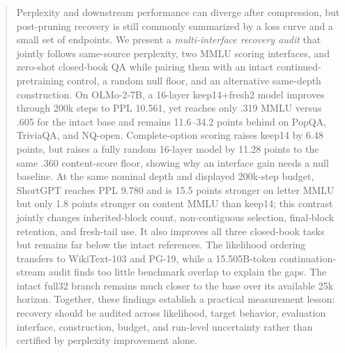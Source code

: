 \begin{abstract}
Perplexity and downstream performance can diverge after compression, but
post-pruning recovery is still commonly summarized by a loss curve and a small
set of endpoints. We present a \emph{multi-interface recovery audit} that
jointly follows same-source perplexity, two MMLU scoring
interfaces, and zero-shot closed-book QA while pairing them with an intact
continued-pretraining control, a random null floor, and an alternative
same-depth construction. On OLMo-2-7B, a 16-layer keep14+fresh2 model improves
through 200k steps to PPL 10.561, yet reaches only .319 MMLU versus .605 for the
intact base and remains 11.6--34.2 points behind on PopQA, TriviaQA, and
NQ-open. Complete-option scoring raises keep14 by 6.48 points, but raises a
fully random 16-layer model by 11.28 points to the same .360 content-score
floor, showing why an interface gain needs a null baseline. At the same nominal
depth and displayed 200k-step budget, ShortGPT reaches PPL 9.780 and is
15.5 points stronger on letter MMLU but only 1.8 points stronger on content
MMLU than keep14; this contrast jointly changes inherited-block count,
non-contiguous selection, final-block retention, and fresh-tail use. It also
improves all three closed-book tasks but remains far below the intact
references. The likelihood ordering transfers to WikiText-103 and PG-19, while
a 15.505B-token continuation-stream audit finds too little benchmark overlap
to explain the gaps. The intact full32 branch remains much
closer to the base over its available 25k horizon. Together, these findings
establish a practical measurement lesson: recovery should be audited across
likelihood, target behavior, evaluation interface, construction, budget, and
run-level uncertainty rather than certified by perplexity improvement alone.
\end{abstract}
